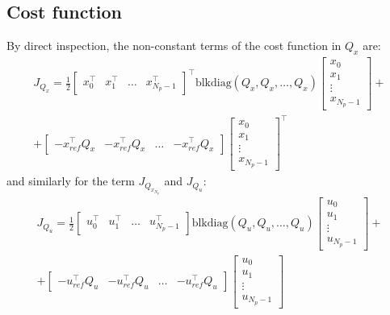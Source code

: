 \documentclass[a4paper,12pt,fleqn]{book}
\newcommand{\Np}{{N_p}}
\newcommand{\blkdiag}{\text{blkdiag}}
\begin{document}
\subsection{Cost function}
By direct inspection, the non-constant terms of the cost function in $Q_x$ are:
\begin{multline}
\label{eq:J_Qx}
 J_{Q_x} = \frac{1}{2}
 \begin{bmatrix}
  x_0^\top & x_1^\top &\dots & x_{\Np-1}^\top
 \end{bmatrix}^\top
 \blkdiag(Q_x, Q_x, \dots, Q_x)
 \begin{bmatrix}
  x_0 \\  x_1\\ \vdots\\  x_{\Np-1}
 \end{bmatrix}
 + \\
 +
  \begin{bmatrix}
  -x_{ref}^\top Q_x & -x_{ref}^\top Q_x &\dots & -x_{ref}^\top Q_x
 \end{bmatrix} 
 \begin{bmatrix}
  x_0 \\ x_1 \\ \vdots \\ x_{\Np-1}
 \end{bmatrix}^\top 
 \end{multline}
 and similarly for the term $J_{Q_{x_\Np}}$ and $J_{Q_u}$: 
\begin{multline}
\label{eq:J_Qu}
 J_{Q_u} = \frac{1}{2}
 \begin{bmatrix}
  u_0^\top & u_1^\top &\dots & u_{\Np-1}^\top
 \end{bmatrix}
 \blkdiag(Q_u, Q_u, \dots, Q_u)
 \begin{bmatrix}
  u_0 \\  u_1\\ \vdots\\  u_{\Np-1}
 \end{bmatrix}
  + \\
 +
  \begin{bmatrix}
  -u_{ref}^\top Q_u & -u_{ref}^\top Q_u &\dots & -u_{ref}^\top Q_u
 \end{bmatrix}
 \begin{bmatrix}
  u_0 \\ u_1 \\ \vdots \\ u_{\Np-1}
 \end{bmatrix} 
 \end{multline}
\end{document}
